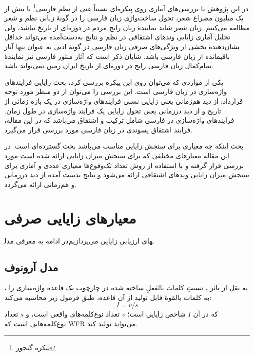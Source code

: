 \documentclass[12pt,onecolumn,a4paper]{article}
\begin{document}
    \par
    در این پژوهش با بررسی‌های آماری روی پیکره‌ای نسبتاً غنی از نظم فارسی\footnote{پیکره گنجور} با بیش از یک میلیون مصراع شعر، تحول ساخت‌واژی زبان فارسی را در گونهٔ زبانی نظم و شعر مطالعه می‌کنیم. زبان شعر شاید نمایندهٔ زبان رایج مردم در دوره‌ای از تاریخ نباشد، ولی تحلیل آماری زایایی وندهای اشتقاقی در نظم و نتایج به‌دست‌آمده می‌تواند حداقل نشان‌دهندۀ بخشی از ویژگی‌های صرفی زبان فارسی در گونهٔ ادبی به عنوان تنها آثار باقیمانده از زبان فارسی باشد. شایان ذکر است که آثار منثور فارسی نیز نمایندهٔ تمام‌کمال زبان فارسی رایج در دوره‌ای از تاریخ ایران زمین نمی‌تواند باشد.

    \par
    یکی از مواردی که می‌توان روی این پیکره بررسی کرد، بحث زایایی فرایندهای واژه‌سازی در زبان فارسی است. این بررسی را می‌توان از دو منظر مورد توجه قرارداد: از دید هم‌زمانی یعنی زایایی نسبی فرایندهای واژه‌سازی در یک بازه زمانی از تاریخ و از دید درزمانی یعنی تحول زایایی یک فرایند واژه‌سازی در طول زمان. فرایندهای واژه‌سازی در فارسی شامل ترکیب و اشتقاق می‌باشد که در این مقاله، فرایند اشتقاق پسوندی در زبان فارسی مورد بررسی قرار می‌گیرد.

    \par
    بحث اینکه چه معیاری برای سنجش زایایی مناسب می‌باشد بحث گسترده‌ای است. در این مقاله معیارهای مختلفی که برای سنجش میزان زایایی ارائه شده است مورد بررسی قرار گرفته و با استفاده از روش تعداد تک‌وقوع‌ها معیاری عددی و آماری برای سنجش میزان زایایی وندهای اشتقاقی ارائه می‌شود و نتایج بدست آمده از دید درزمانی و هم‌زمانی ارائه می‌گردد.

    \section{معیارهای زایایی صرفی}
    در ادامه به معرفی مدل‎های ارزیابی زایایی می‌پردازیم.

    \subsection{مدل آرونوف}
    ، به نقل از بائر ، نسبتِ کلمات بالفعلِ ساخته شده در چارچوب یک قاعده واژه‌سازی  را به کلمات بالقوۀ قابل تولید از آن قاعده، طبق فرمول زیر محاسبه می‌کند:
    \begin{equation}
        I=v / s
    \end{equation}
    که در آن $I$ شاخص زایایی است؛ $v$ تعداد نوع‌کلمه‌های واقعی است، و $s$ تعداد نوع‌کلمه‌هایی است که WFR می‌تواند تولید کند.
\end{document}
